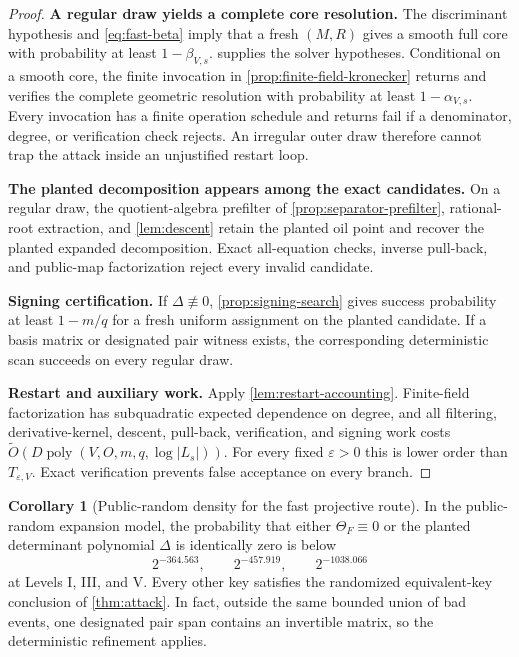 \documentclass[11pt,a4paper]{article}
\theoremstyle{definition}
\newtheorem{corollary}[theorem]{Corollary}
\theoremstyle{remark}
\newcommand{\proofstep}[1]{\par\smallskip\noindent\textbf{#1}\enspace}
\begin{document}
\begin{proof}
\proofstep{A regular draw yields a complete core resolution.}
The discriminant hypothesis and \eqref{eq:fast-beta} imply that a fresh $(M,R)$ gives a smooth full core with probability at least $1-\beta_{V,s}$.   supplies the solver hypotheses.  Conditional on a smooth core, the finite invocation in \cref{prop:finite-field-kronecker} returns and verifies the complete geometric resolution with probability at least $1-\alpha_{V,s}$.  Every invocation has a finite operation schedule and returns \textsf{fail} if a denominator, degree, or verification check rejects.  An irregular outer draw therefore cannot trap the attack inside an unjustified restart loop.

\proofstep{The planted decomposition appears among the exact candidates.}
On a regular draw, the quotient-algebra prefilter of \cref{prop:separator-prefilter}, rational-root extraction, and \cref{lem:descent} retain the planted oil point and recover the planted expanded decomposition.  Exact all-equation checks, inverse pull-back, and public-map factorization reject every invalid candidate.

\proofstep{Signing certification.}
If $\Delta\not\equiv0$, \cref{prop:signing-search} gives success probability at least $1-m/q$ for a fresh uniform assignment on the planted candidate.  If a basis matrix or designated pair witness exists, the corresponding deterministic scan succeeds on every regular draw.

\proofstep{Restart and auxiliary work.}
Apply \cref{lem:restart-accounting}.  Finite-field factorization has subquadratic expected dependence on degree, and all filtering, derivative-kernel, descent, pull-back, verification, and signing work costs $\widetilde O(D\operatorname{poly}(V,O,m,q,\log|L_s|))$.  For every fixed $\varepsilon>0$ this is lower order than $T_{\varepsilon,V}$.  Exact verification prevents false acceptance on every branch.
\end{proof}

\begin{corollary}[Public-random density for the fast projective route]\label{cor:ideal-recovery}
In the public-random expansion model, the probability that either $\Theta_F\equiv0$ or the planted determinant polynomial $\Delta$ is identically zero is below
\[
2^{-364.563},\qquad2^{-457.919},\qquad2^{-1038.066}
\]
at Levels I, III, and V.  Every other key satisfies the randomized equivalent-key conclusion of \cref{thm:attack}.  In fact, outside the same bounded union of bad events, one designated pair span contains an invertible matrix, so the deterministic refinement applies.
\end{corollary}
\end{document}
